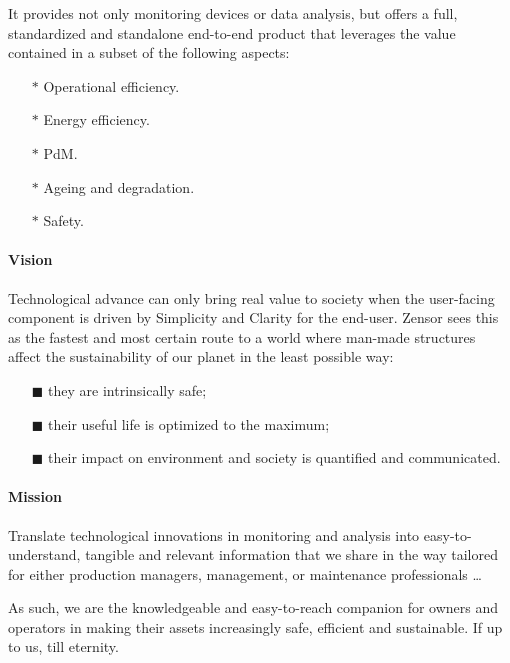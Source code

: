 It provides not only monitoring devices or data analysis, but offers a full, standardized and standalone end-to-end product that leverages the value contained in a subset of the following aspects:
\begin{multicols}{2}
    \begin{itemize} 
        \item[$\ast$] Operational efficiency.
        \item[$\ast$] Energy efficiency. 
        \item[$\ast$] \acl{PdM}.
        \item[$\ast$] Ageing and degradation.
        \item[$\ast$] Safety.
    \end{itemize}
\end{multicols}

\paragraph{Vision} 
Technological advance can only bring real value to society when the user-facing component is driven by Simplicity and Clarity for the end-user. 
Zensor sees this as the fastest and most certain route to a world where man-made structures affect the sustainability of our planet in the least possible way:
\begin{enumerate}
    \item[$\blacksquare$] they are intrinsically safe;
    \item[$\blacksquare$] their useful life is optimized to the maximum;
    \item[$\blacksquare$] their impact on environment and society is quantified and communicated.
\end{enumerate}

\paragraph{Mission}
Translate technological innovations in monitoring and analysis into easy-to-understand, tangible and relevant information that we share in the way tailored for either production managers,
management, or maintenance professionals \dots \par
As such, we are the knowledgeable and easy-to-reach companion for owners and operators in making their assets increasingly safe, efficient and sustainable. If up to us, till eternity.